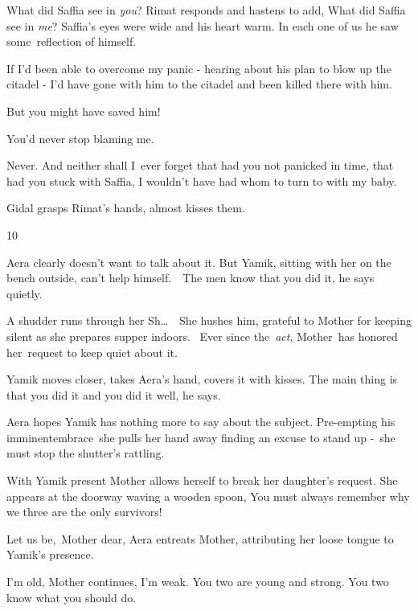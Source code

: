 \documentclass[letterpaper]{article}
\begin{document}
{\textquotedbl}What did Saffia see in \textit{you}?{\textquotedbl} Rimat responds and hastens to add,
{\textquotedbl}What did Saffia see in \textit{me}? Saffia's eyes were wide and his heart warm. In each one of us he saw
some\ reflection of himself.{\textquotedbl}\ 

{\textquotedbl}If I'd been able to overcome my panic - hearing about his plan to blow up the citadel - I'd have gone
with him to the citadel and been killed there with him.{\textquotedbl} 

{\textquotedbl}But you might have saved him!{\textquotedbl} 

{\textquotedbl}You'd never stop blaming me.{\textquotedbl} 

{\textquotedbl}Never. And neither shall I\ ever forget that had you not panicked in time, that had you stuck with
Saffia, I wouldn't have had whom to turn to with my baby.{\textquotedbl}

Gidal grasps Rimat's hands, almost kisses them. ~


\bigskip

10 

Aera clearly doesn't want to talk about it. But Yamik, sitting with her on the bench outside, can't help
himself.\ \ {\textquotedbl}The men know that you did it,{\textquotedbl} he says quietly.

A shudder runs through her {\textquotedbl}Sh{\dots}{\textquotedbl}\ \ She hushes him, grateful to Mother for keeping
silent as she prepares supper indoors.~ Ever since the\ \textit{act}, Mother~has honored her\ request to keep quiet
about it.\ 

Yamik moves closer, takes Aera's hand, covers it with kisses. {\textquotedbl}The main thing is that you did it and you
did it well,{\textquotedbl} he says.

Aera hopes Yamik has nothing more to say about the subject. Pre-empting his imminentembrace\ she pulls her hand away
finding an excuse to stand up -\ she must stop the shutter's rattling.\ 

With Yamik present Mother allows herself to break her daughter's request. She appears at the doorway waving a wooden
spoon, {\textquotedbl}You must always remember why we three are the only survivors!{\textquotedbl} 

{\textquotedbl}Let us be,\ Mother dear,{\textquotedbl} Aera entreats Mother, attributing her loose tongue to Yamik's
presence.

{\textquotedbl}I'm old,{\textquotedbl} Mother continues, {\textquotedbl}I'm weak. You two are young and strong. You two
know what you should do.{\textquotedbl}
\end{document}
